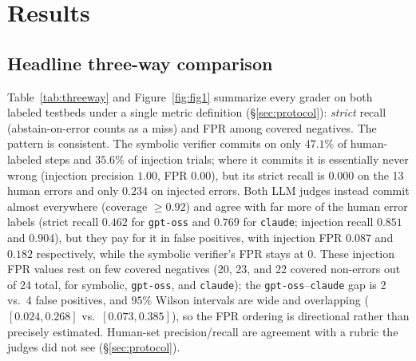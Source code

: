 \section{Results}
\label{sec:results}

\subsection{Headline three-way comparison}
Table~\ref{tab:threeway} and Figure~\ref{fig:fig1} summarize every grader on
both labeled testbeds under a single metric definition
(\S\ref{sec:protocol}): \emph{strict} recall (abstain-on-error counts as a miss)
and FPR among covered negatives. The pattern is consistent. The symbolic
verifier commits on only $47.1\%$ of human-labeled steps and $35.6\%$ of
injection trials; where it commits it is essentially never wrong (injection
precision $1.00$, FPR $0.00$), but its strict recall is $0.000$ on the 13 human
errors and only $0.234$ on injected errors. Both LLM judges instead commit
almost everywhere (coverage $\geq 0.92$) and agree with far more of the human
error labels (strict recall $0.462$ for \texttt{gpt-oss} and $0.769$ for
\texttt{claude}; injection recall $0.851$ and $0.904$), but they pay for it in
false positives, with injection FPR $0.087$ and $0.182$ respectively, while the
symbolic verifier's FPR stays at $0$. These injection FPR values rest on few
covered negatives (20, 23, and 22 covered non-errors out of 24 total, for
symbolic, \texttt{gpt-oss}, and \texttt{claude}); the
\texttt{gpt-oss}--\texttt{claude} gap is 2 vs.\ 4 false positives, and $95\%$
Wilson intervals are wide and overlapping ($[0.024, 0.268]$ vs.\ $[0.073,
0.385]$), so the FPR ordering is directional rather than precisely estimated.
Human-set precision/recall are agreement
with a rubric the judges did not see (\S\ref{sec:protocol}).

